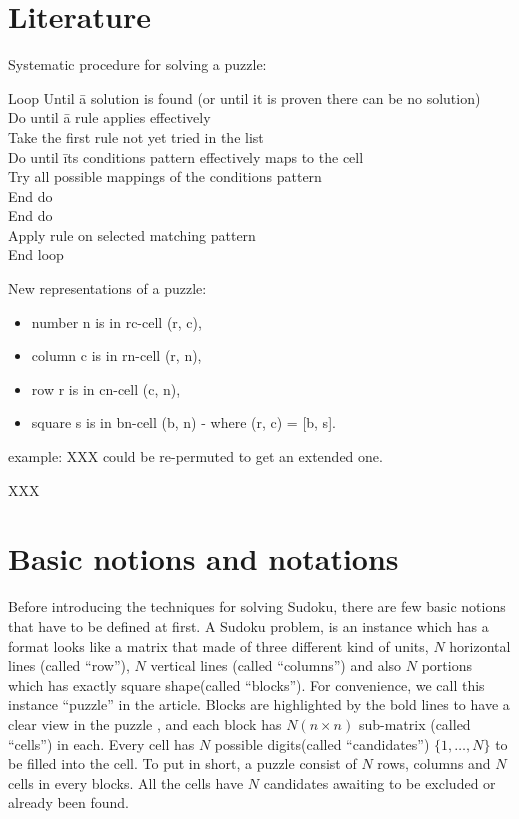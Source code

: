 \documentclass[11pt]{report}
\begin{document}
\section{Literature}
\label{sec:introLiterature}

Systematic procedure for solving a puzzle:
\begin{tabbing}
Loop Until \= a solution is found (or until it is proven there can be no solution) \\
\> Do until \= a rule applies  effectively \\
\> \> Take the first rule not yet tried in the list \\
\> \> Do until \= its conditions pattern effectively maps to the cell \\
\> \> \> Try all possible mappings of the conditions pattern \\
\> \> End do\\
\> End do\\
\> Apply rule on selected matching pattern \\
End loop\\
\end{tabbing}

New representations of a puzzle:
\begin{itemize}
\item number n is in rc-cell (r, c),
\item column c is in rn-cell (r, n),
\item row r is in cn-cell (c, n),
\item square s is in bn-cell (b, n) - where (r, c) = [b, s].
\end{itemize}

example: XXX could be re-permuted to get an extended one.

\cite{Berthier2007Sudoku} XXX





\section{Basic notions and notations}
\label{sec:basicnotnotat}

Before introducing the techniques for solving Sudoku, there are few basic notions that have to be defined at first. A Sudoku problem, is an instance which has a format looks like a matrix that made of three different kind of units, $N$ horizontal lines (called ``row''), $N$ vertical lines (called ``columns'') and also $N$ portions which has exactly square shape(called ``blocks''). For convenience, we call this instance ``puzzle'' in the article. Blocks are highlighted by the bold lines to have a clear view in the puzzle , and each block has $N (n \times n)$ sub-matrix (called ``cells'') in each. Every cell has $N$ possible digits(called ``candidates'') $\{1, \dots, N\}$ to be filled into the cell. To put in short, a puzzle consist of $N$ rows, columns and $N$ cells in every blocks. All the cells have $N$ candidates awaiting to be excluded or already been found.
\end{document}
